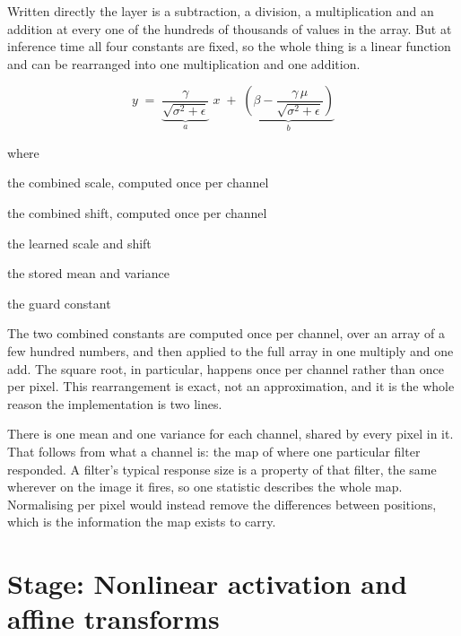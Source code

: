 Written directly the layer is a subtraction, a division, a multiplication and an addition at every one of the hundreds of thousands of values in the array. But at inference time all four constants are fixed, so the whole thing is a linear function and can be rearranged into one multiplication and one addition.


\begin{equation}
y \;=\; \underbrace{\frac{\gamma}{\sqrt{\sigma^{2}+\epsilon}}}_{\textstyle a} \; x \;+\; \underbrace{\left(\beta - \frac{\gamma\,\mu}{\sqrt{\sigma^{2}+\epsilon}}\right)}_{\textstyle b}
\end{equation}

\noindent where
\begin{description}[leftmargin=2.4em,style=nextline,font=\normalfont\ttfamily]\setlength\itemsep{1pt}
  \item[{$a$}] \normalfont the combined scale, computed once per channel
  \item[{$b$}] \normalfont the combined shift, computed once per channel
  \item[{$\gamma,\,\beta$}] \normalfont the learned scale and shift
  \item[{$\mu,\,\sigma^{2}$}] \normalfont the stored mean and variance
  \item[{$\epsilon$}] \normalfont the guard constant
\end{description}
The two combined constants are computed once per channel, over an array of a few hundred numbers, and then applied to the full array in one multiply and one add. The square root, in particular, happens once per channel rather than once per pixel. This rearrangement is exact, not an approximation, and it is the whole reason the implementation is two lines.


There is one mean and one variance for each channel, shared by every pixel in it. That follows from what a channel is: the map of where one particular filter responded. A filter's typical response size is a property of that filter, the same wherever on the image it fires, so one statistic describes the whole map. Normalising per pixel would instead remove the differences between positions, which is the information the map exists to carry.



\section*{Stage: Nonlinear activation and affine transforms}
